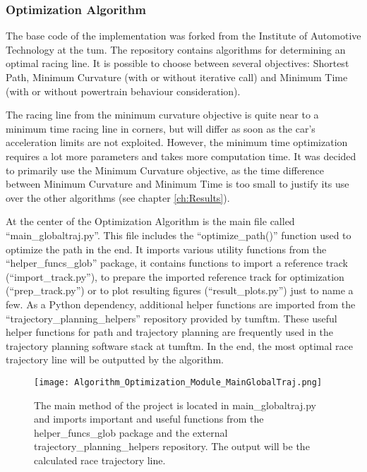\subsubsection{Optimization Algorithm} \label{sec:Optimization Algorithm}
The base code of the implementation was forked from the Institute of Automotive Technology at the \acrlong{tum}.
The repository contains algorithms for determining an optimal racing line. It is possible to choose between several objectives: Shortest Path, Minimum Curvature (with or without iterative call) and Minimum Time (with or without powertrain behaviour consideration). \cite{tumftm_optimization_algoritm}

The racing line from the minimum curvature objective is quite near to a minimum time racing line in corners, but will differ as soon as the car's acceleration limits are not exploited. However, the minimum time optimization requires a lot more parameters and takes more computation time. It was decided to primarily use the Minimum Curvature objective, as the time difference between Minimum Curvature and Minimum Time is too small to justify its use over the other algorithms (see chapter \ref{ch:Results}).

At the center of the Optimization Algorithm is the main file called ``main\_globaltraj.py''. This file includes the ``optimize\_path()'' function used to optimize the path in the end. It imports various utility functions from the ``helper\_funcs\_glob'' package, it contains functions to import a reference track (``import\_track.py''), to prepare the imported reference track for optimization (``prep\_track.py'') or to plot resulting figures (``result\_plots.py'') just to name a few. As a Python dependency, additional helper functions are imported from the ``trajectory\_planning\_helpers'' repository provided by \acrshort{tumftm}. \cite{tumftm_trajectory_planning_helpers}
These useful helper functions for path and trajectory planning are frequently used in the trajectory planning software stack at \acrshort{tumftm}.
In the end, the most optimal race trajectory line will be outputted by the algorithm.
\begin{figure}[H]
    \centering
    \texttt{[image: Algorithm\_Optimization\_Module\_MainGlobalTraj.png]}
    \caption{The main method of the project is located in main\_globaltraj.py and imports important and useful functions from the helper\_funcs\_glob package and the external trajectory\_planning\_helpers repository. The output will be the calculated race trajectory line.}
    \label{fig:Optimization Algorithm Module MainGlobalTraj}
\end{figure}



